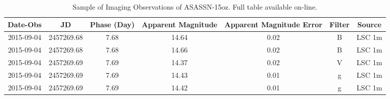 \begin{table*}
\centering
\caption{Sample of Imaging Observations of ASASSN-15oz. Full table available on-line.\label{tab:LcObs}}
\begin{tabular}{ccccccc}
\hline
Date-Obs & JD & Phase (Day) & Apparent Magnitude & Apparent Magnitude Error & Filter & Source \\
\hline
2015-09-04 & 2457269.68 & 7.68 & 14.64 & 0.02 & B & LSC 1m \\
2015-09-04 & 2457269.68 & 7.68 & 14.66 & 0.02 & B & LSC 1m \\
2015-09-04 & 2457269.69 & 7.69 & 14.37 & 0.02 & V & LSC 1m \\
2015-09-04 & 2457269.69 & 7.69 & 14.43 & 0.01 & g & LSC 1m \\
2015-09-04 & 2457269.69 & 7.69 & 14.42 & 0.01 & g & LSC 1m \\
\hline
\end{tabular}
\end{table*}
